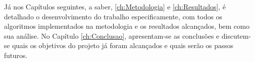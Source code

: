 Já nos Capítulos seguintes, a saber, \ref{ch:Metodologia} e \ref{ch:Resultados}, é detalhado o desenvolvimento do trabalho especificamente, com todos os algoritmos implementados na metodologia e os resultados alcançados, bem como sua análise. No Capítulo \ref{ch:Conclusao}, apresentam-se as conclusões e discutem-se quais os objetivos do projeto já foram alcançados e quais serão os passos futuros.











